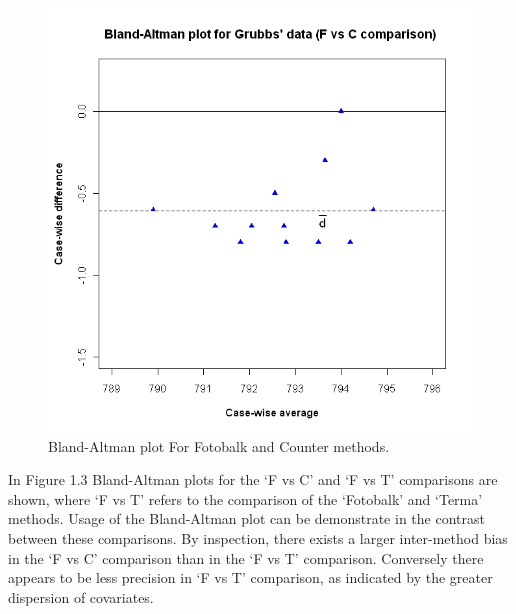 \documentclass[Main.tex]{subfiles}
\begin{document}
	
	\begin{figure}[h!]
		\begin{center}
			\includegraphics[width=120mm]{images/GrubbsBAplot-noLOA.jpeg}
			\caption{Bland-Altman plot For Fotobalk and Counter methods.}\label{GrubbsBA-noLOA}
		\end{center}
	\end{figure}
	
	
	
	In Figure 1.3 Bland-Altman plots for the `F vs C' and `F vs T'
	comparisons are shown, where `F vs T' refers to the comparison of
	the `Fotobalk' and `Terma' methods. Usage of the Bland-Altman plot
	can be demonstrate in the contrast between these comparisons. By inspection, there exists a larger inter-method bias in the `F vs C' comparison than in the `F vs T' comparison. Conversely there
	appears to be less precision in `F vs T' comparison, as indicated
	by the greater dispersion of covariates.
	
\end{document}
